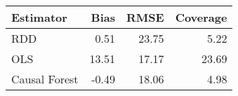 \begin{table}[ht]
\centering
\begin{tabular}{lrrr}
  \hline
Estimator & Bias & RMSE & Coverage \\ 
  \hline
RDD & 0.51 & 23.75 & 5.22 \\ 
  OLS & 13.51 & 17.17 & 23.69 \\ 
  Causal Forest & -0.49 & 18.06 & 4.98 \\ 
   \hline
\end{tabular}
\end{table}
